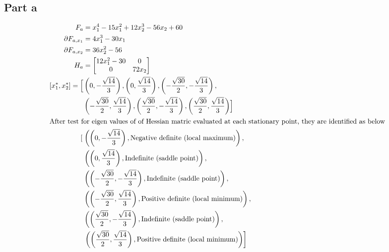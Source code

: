 \documentclass[a4paper,12pt]{article} %
\begin{document}
\subsection{Part a}
\begin{align*}
  F_a &= x_{1}^{4} - 15 x_{1}^{2} + 12 x_{2}^{3} - 56 x_{2} + 60\\
  \partial F_{a,x_1} &= 4 x_{1}^{3} - 30 x_{1}\\
  \partial F_{a,x_2} &= 36 x_{2}^{2} - 56\\
  H_a &= \left[\begin{matrix}12 x_{1}^{2} - 30 & 0\\0 & 72 x_{2}\end{matrix}\right]\\
  \left[x_1^*, x_2^*\right] = \Bigl[ &\left( 0, - \frac{\sqrt{14}}{3}\right), \left( 0, \frac{\sqrt{14}}{3}\right), \left( - \frac{\sqrt{30}}{2}, - \frac{\sqrt{14}}{3}\right), \\
&\left( - \frac{\sqrt{30}}{2}, \frac{\sqrt{14}}{3}\right), \left( \frac{\sqrt{30}}{2}, - \frac{\sqrt{14}}{3}\right), \left( \frac{\sqrt{30}}{2}, \frac{\sqrt{14}}{3}\right) \Bigr]\\
\intertext{After test for eigen values of of Hessian matric evaluated at each stationary point, they are identified as below}
\left[ \right. &\left( \left( 0, - \frac{\sqrt{14}}{3}\right), \mathtt{\text{Negative definite (local maximum)}}\right), \\
&\left( \left( 0, \frac{\sqrt{14}}{3}\right), \mathtt{\text{Indefinite (saddle point)}}\right), \\
&\left( \left( - \frac{\sqrt{30}}{2}, - \frac{\sqrt{14}}{3}\right), \mathtt{\text{Indefinite (saddle point)}}\right), \\
&\left( \left( - \frac{\sqrt{30}}{2}, \frac{\sqrt{14}}{3}\right), \mathtt{\text{Positive definite (local minimum)}}\right), \\
&\left( \left( \frac{\sqrt{30}}{2}, - \frac{\sqrt{14}}{3}\right), \mathtt{\text{Indefinite (saddle point)}}\right), \\
&\left. \left( \left( \frac{\sqrt{30}}{2}, \frac{\sqrt{14}}{3}\right), \mathtt{\text{Positive definite (local minimum)}}\right) \right]
\end{align*}
\end{document}
